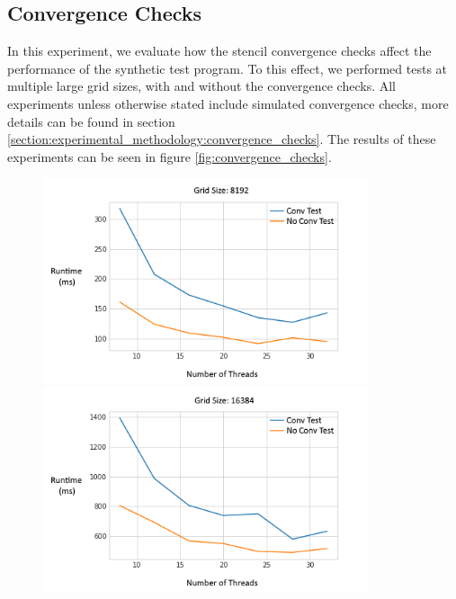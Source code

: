\subsection{Convergence Checks}
\label{section:results:convergence_checks}

In this experiment, we evaluate how the stencil convergence checks affect the performance of the synthetic test program. To this effect, we performed tests at multiple large grid sizes, with and without the convergence checks. All experiments unless otherwise stated include simulated convergence checks, more details can be found in section \ref{section:experimental_methodology:convergence_checks}. The results of these experiments can be seen in figure \ref{fig:convergence_checks}.



\begin{figure}[H]
    \vspace*{-1.5in}
    \begin{center}
        \includegraphics[width=0.85\textwidth]{graphics/performance_characteristics/conv-8192.png}
        \includegraphics[width=0.85\textwidth]{graphics/performance_characteristics/conv-16384.png}

\end{center}
\end{figure}
